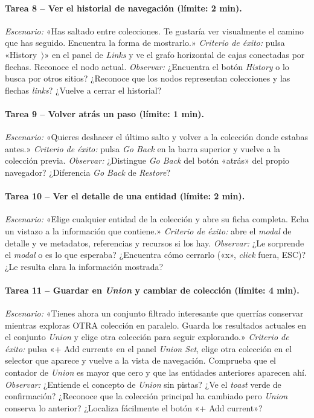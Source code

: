 \paragraph{Tarea 8 -- Ver el historial de navegación (límite: 2 min).}
\textit{Escenario:} «Has saltado entre colecciones. Te gustaría ver visualmente el camino
que has seguido. Encuentra la forma de mostrarlo.»
\textit{Criterio de éxito:} pulsa «History~$\rangle$» en el panel de \textit{Links} y
ve el grafo horizontal de cajas conectadas por flechas. Reconoce el nodo actual.
\textit{Observar:} ¿Encuentra el botón \textit{History} o lo busca por otros sitios?
¿Reconoce que los nodos representan colecciones y las flechas \textit{links}? ¿Vuelve a
cerrar el historial?

\paragraph{Tarea 9 -- Volver atrás un paso (límite: 1 min).}
\textit{Escenario:} «Quieres deshacer el último salto y volver a la colección donde
estabas antes.»
\textit{Criterio de éxito:} pulsa \textit{Go Back} en la barra superior y vuelve a la
colección previa.
\textit{Observar:} ¿Distingue \textit{Go Back} del botón «atrás» del propio navegador?
¿Diferencia \textit{Go Back} de \textit{Restore}?

\paragraph{Tarea 10 -- Ver el detalle de una entidad (límite: 2 min).}
\textit{Escenario:} «Elige cualquier entidad de la colección y abre su ficha completa.
Echa un vistazo a la información que contiene.»
\textit{Criterio de éxito:} abre el \textit{modal} de detalle y ve metadatos, referencias y
recursos si los hay.
\textit{Observar:} ¿Le sorprende el \textit{modal} o es lo que esperaba? ¿Encuentra cómo
cerrarlo («x», \textit{click} fuera, ESC)? ¿Le resulta clara la información mostrada?

\paragraph{Tarea 11 -- Guardar en \textit{Union} y cambiar de colección (límite: 4 min).}
\textit{Escenario:} «Tienes ahora un conjunto filtrado interesante que querrías conservar
mientras exploras OTRA colección en paralelo. Guarda los resultados actuales en el conjunto
\textit{Union} y elige otra colección para seguir explorando.»
\textit{Criterio de éxito:} pulsa «+ Add current» en el panel \textit{Union Set},
elige otra colección en el selector que aparece y vuelve a la vista de navegación. Comprueba
que el contador de \textit{Union} es mayor que cero y que las entidades anteriores aparecen
ahí.
\textit{Observar:} ¿Entiende el concepto de \textit{Union} sin pistas? ¿Ve el \textit{toast}
verde de confirmación? ¿Reconoce que la colección principal ha cambiado pero \textit{Union}
conserva lo anterior? ¿Localiza fácilmente el botón «+ Add current»?

